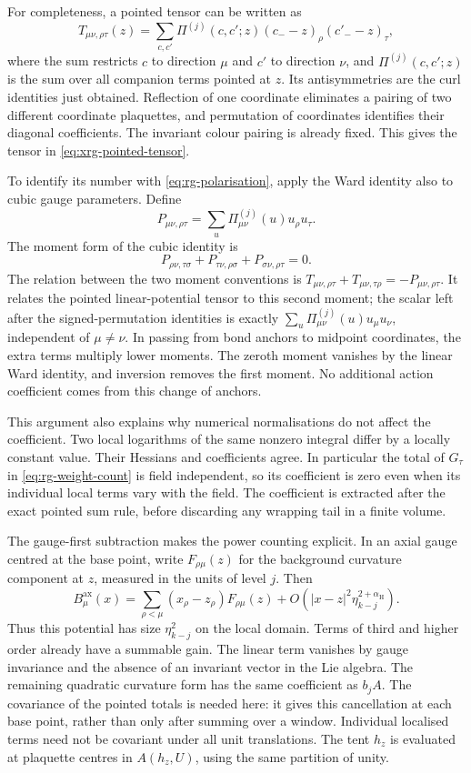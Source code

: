 \documentclass[11pt,letterpaper,reqno]{amsart}
\theoremstyle{definition}
\theoremstyle{remark}
\begin{document}
For completeness, a pointed tensor can be written
as
\[
 T_{\mu\nu,\rho\tau}(z)
    =\sum_{c,c'}\Pi^{(j)}(c,c';z)
                 (c_--z)_\rho(c'_--z)_\tau,
\]
where the sum restricts $c$ to direction $\mu$
and $c'$ to direction $\nu$, and $\Pi^{(j)}(c,c';z)$
is the sum over all companion terms pointed at $z$. Its antisymmetries
are the curl identities just obtained. Reflection
of one coordinate eliminates a pairing of two
different coordinate plaquettes, and permutation
of coordinates identifies their diagonal
coefficients. The invariant colour pairing is
already fixed. This gives the tensor in
\eqref{eq:xrg-pointed-tensor}.

To identify its number with
\eqref{eq:rg-polarisation}, apply the Ward identity
also to cubic gauge parameters. Define
\[
 P_{\mu\nu,\rho\tau}
       =\sum_u\Pi^{(j)}_{\mu\nu}(u)u_\rho u_\tau.
\]
The moment form of the cubic identity is
\[
 P_{\rho\nu,\tau\sigma}
   +P_{\tau\nu,\rho\sigma}
    +P_{\sigma\nu,\rho\tau}=0.
\]
The relation between the two moment conventions is
$T_{\mu\nu,\rho\tau}+T_{\mu\nu,\tau\rho}
=-P_{\mu\nu,\rho\tau}$. It relates the pointed
linear-potential tensor to this second moment;
the scalar left after the signed-permutation
identities is exactly
$\sum_u\Pi^{(j)}_{\mu\nu}(u)u_\mu u_\nu$,
independent of $\mu\ne\nu$. In passing from
bond anchors to midpoint coordinates, the
extra terms multiply lower moments. The
zeroth moment vanishes by the linear Ward
identity, and inversion removes the first
moment. No additional action coefficient
comes from this change of anchors.

This argument also explains why numerical
normalisations do not affect the coefficient.
Two local logarithms of the same nonzero
integral differ by a locally constant value.
Their Hessians and coefficients agree. In
particular the total of $G_\tau$ in
\eqref{eq:rg-weight-count} is field independent,
so its coefficient is zero even when its
individual local terms vary with the field.
The coefficient is extracted after the exact
pointed sum rule, before discarding any
wrapping tail in a finite volume.

The gauge-first subtraction makes the power
counting explicit. In an axial gauge centred at the base point,
write $F_{\rho\mu}(z)$ for the background curvature component at
$z$, measured in the units of level $j$. Then
\[
 B^{\mathrm{ax}}_\mu(x)=
 \sum_{\rho<\mu}(x_\rho-z_\rho)F_{\rho\mu}(z)
 +O\!\left(|x-z|^2\eta_{k-j}^{2+\alpha_{\mathrm H}}\right).
\]
Thus this potential has size $\eta_{k-j}^2$ on the local domain.
Terms of third and higher order already have a summable gain.
The linear term vanishes by gauge invariance and the absence of
an invariant vector in the Lie algebra. The remaining quadratic
curvature form has the same coefficient as $b_jA$.
The covariance of the pointed totals is needed here: it gives this
cancellation at each base point, rather than only after summing
over a window. Individual localised terms need not be covariant
under all unit translations. The tent $h_z$ is evaluated at
plaquette centres in $A(h_z,U)$, using the same partition of unity.
\end{document}
